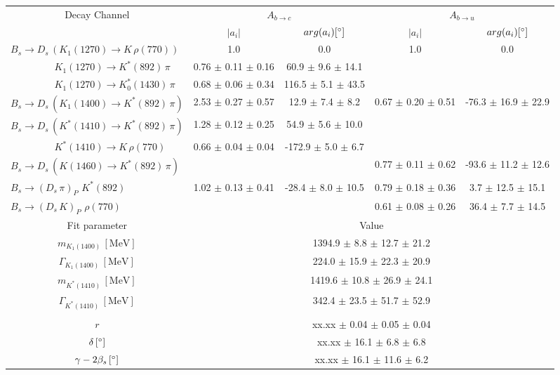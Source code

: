 \begin{tabular}{l c c c c } 
\hline
\hline
\multicolumn{1}{c}{Decay Channel} & \multicolumn{2}{c}{$A_{b \to c}$} & \multicolumn{2}{c}{$A_{b \to u}$}  \\ 
 & \multicolumn{1}{c}{$\vert a_i \vert$}  & \multicolumn{1}{c}{$arg(a_i) [^{\circ}]$}  & \multicolumn{1}{c}{$\vert a_i \vert$} & \multicolumn{1}{c}{$arg(a_i) [^{\circ}]$} \\ 
\hline
 $B_s \to D_s \, ( K_1(1270) \to K \, \rho(770) ) $ &  1.0 & 0.0 & 1.0 & 0.0  \\ 
$\phantom{B_s \to D_s \, (} K_1(1270) \to K^{*}(892) \, \pi \phantom{)} $ & 0.76 $\pm$ 0.11 $\pm$ 0.16 & 60.9 $\pm$ 9.6 $\pm$ 14.1 & &   \\ 
$\phantom{B_s \to D_s \, (} K_1(1270) \to K^{*}_{0}(1430) \, \pi \phantom{)} $ & 0.68 $\pm$ 0.06 $\pm$ 0.34 & 116.5 $\pm$ 5.1 $\pm$ 43.5 & &   \\ 
$B_s \to D_s \, ( K_1(1400) \to K^{*}(892) \, \pi ) $ & 2.53 $\pm$ 0.27 $\pm$ 0.57 & 12.9 $\pm$ 7.4 $\pm$ 8.2 & 0.67 $\pm$ 0.20 $\pm$ 0.51 & -76.3 $\pm$ 16.9 $\pm$ 22.9 \\ 
$B_s \to D_s \, ( K^{*}(1410) \to K^{*}(892) \, \pi ) $ & 1.28 $\pm$ 0.12 $\pm$ 0.25 & 54.9 $\pm$ 5.6 $\pm$ 10.0 &  &  \\ 
$\phantom{B_s \to D_s \, (} K^{*}(1410) \to K \, \rho(770) \phantom{)} $ & 0.66 $\pm$ 0.04 $\pm$ 0.04 & -172.9 $\pm$ 5.0 $\pm$ 6.7 & &   \\ 
$B_s \to D_s \, ( K(1460) \to K^{*}(892) \, \pi ) $ & & &0.77 $\pm$ 0.11 $\pm$ 0.62 & -93.6 $\pm$ 11.2 $\pm$ 12.6 \\ 
$B_s \to ( D_s \, \pi)_{P} \, \, K^{*}(892) $ & 1.02 $\pm$ 0.13 $\pm$ 0.41 & -28.4 $\pm$ 8.0 $\pm$ 10.5 & 0.79 $\pm$ 0.18 $\pm$ 0.36 & 3.7 $\pm$ 12.5 $\pm$ 15.1 \\ 
$B_s \to ( D_s \, K)_{P} \, \, \rho(770) $ & & &0.61 $\pm$ 0.08 $\pm$ 0.26 & 36.4 $\pm$ 7.7 $\pm$ 14.5 \\ 
\hline
\hline
\multicolumn{1}{c}{Fit parameter} & \multicolumn{4}{c}{Value}  \\ 
\hline
\multicolumn{1}{c}{$m_{K_1(1400)} \, [\text{MeV}]$} & \multicolumn{4}{c}{1394.9 $\pm$ 8.8 $\pm$ 12.7 $\pm$ 21.2} \\ 
\multicolumn{1}{c}{$\Gamma_{K_1(1400)} \, [\text{MeV}]$} & \multicolumn{4}{c}{224.0 $\pm$ 15.9 $\pm$ 22.3 $\pm$ 20.9} \\ 
\multicolumn{1}{c}{$m_{K^{*}(1410)} \, [\text{MeV}]$} & \multicolumn{4}{c}{1419.6 $\pm$ 10.8 $\pm$ 26.9 $\pm$ 24.1} \\ 
\multicolumn{1}{c}{$\Gamma_{K^{*}(1410)} \, [\text{MeV}]$} & \multicolumn{4}{c}{342.4 $\pm$ 23.5 $\pm$ 51.7 $\pm$ 52.9} \\ 
 \\ 
\multicolumn{1}{c}{$r$} & \multicolumn{4}{c}{xx.xx $\pm$ 0.04 $\pm$ 0.05 $\pm$ 0.04} \\ 
\multicolumn{1}{c}{$\delta \, [^{\circ}]$} & \multicolumn{4}{c}{xx.xx $\pm$ 16.1 $\pm$ 6.8 $\pm$ 6.8} \\ 
\multicolumn{1}{c}{$\gamma - 2 \beta_{s} \, [^{\circ}]$} & \multicolumn{4}{c}{xx.xx $\pm$ 16.1 $\pm$ 11.6 $\pm$ 6.2} \\ 
\hline
\hline
\end{tabular}
